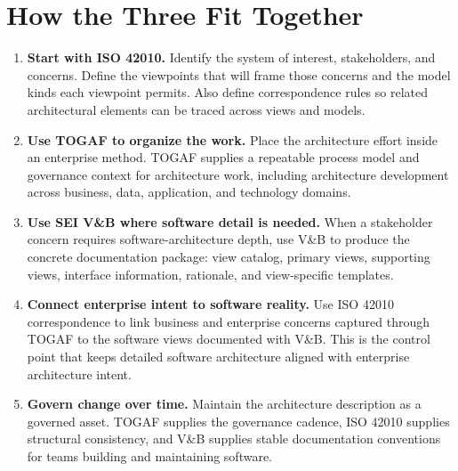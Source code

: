 \documentclass[11pt]{article}
\begin{document}
\section*{How the Three Fit Together}
\begin{enumerate}[leftmargin=1.5em]
    \item \textbf{Start with ISO 42010.} Identify the system of interest, stakeholders, and concerns. Define the viewpoints that will frame those concerns and the model kinds each viewpoint permits. Also define correspondence rules so related architectural elements can be traced across views and models.\cite{iso42010cm,iso42010gettingstarted,iso42010faq}
    \item \textbf{Use TOGAF to organize the work.} Place the architecture effort inside an enterprise method. TOGAF supplies a repeatable process model and governance context for architecture work, including architecture development across business, data, application, and technology domains.\cite{togafstd,togafadm}
    \item \textbf{Use SEI V\&B where software detail is needed.} When a stakeholder concern requires software-architecture depth, use V\&B to produce the concrete documentation package: view catalog, primary views, supporting views, interface information, rationale, and view-specific templates.\cite{sei_vb_factsheet,sei_vb_book}
    \item \textbf{Connect enterprise intent to software reality.} Use ISO 42010 correspondence to link business and enterprise concerns captured through TOGAF to the software views documented with V\&B. This is the control point that keeps detailed software architecture aligned with enterprise architecture intent.\cite{iso42010cm,iso42010faq}
    \item \textbf{Govern change over time.} Maintain the architecture description as a governed asset. TOGAF supplies the governance cadence, ISO 42010 supplies structural consistency, and V\&B supplies stable documentation conventions for teams building and maintaining software.\cite{togafstd,iso42010ads,sei_vb_book}
\end{enumerate}
\end{document}
